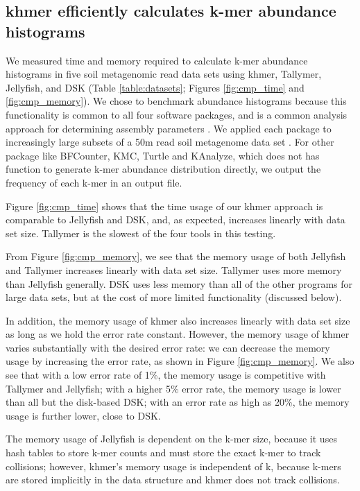 \documentclass[10pt]{article}
\begin{document}


\subsection*{khmer efficiently calculates k-mer abundance histograms}

We measured time and memory required to calculate k-mer abundance
histograms in five soil metagenomic read data sets using khmer,
Tallymer, Jellyfish, and DSK (Table \ref{table:datasets}; Figures
\ref{fig:cmp_time} and \ref{fig:cmp_memory}).  We chose to benchmark
abundance histograms because this functionality is common to all four
software packages, and is a common analysis approach for determining
assembly parameters \cite{Chikhi:2014aa}.  We applied each package to
increasingly large subsets of a 50m read soil metagenome data set
\cite{Howe2012}. For other package like BFCounter, KMC, Turtle and
KAnalyze, which does not has function to generate k-mer abundance
distribution directly, we output the frequency of each k-mer in an
output file.


Figure \ref{fig:cmp_time} shows that the time usage of our khmer
approach is comparable to Jellyfish and DSK, and, as expected,
increases linearly with data set size. Tallymer is the slowest of the
four tools in this testing.

From Figure \ref{fig:cmp_memory}, we see that the memory usage of both
Jellyfish and Tallymer increases linearly with data set size. Tallymer
uses more memory than Jellyfish generally.  DSK uses less memory than
all of the other programs for large data sets, but at the cost of more
limited functionality (discussed below).

In addition, the memory usage of khmer also increases linearly with
data set size as long as we hold the error rate constant.  However,
the memory usage of khmer varies substantially with the desired error
rate: we can decrease the memory usage by increasing the error rate,
as shown in Figure \ref{fig:cmp_memory}.  We also see that with a low
error rate of 1\%, the memory usage is competitive with Tallymer and
Jellyfish; with a higher 5\% error rate, the memory usage is lower
than all but the disk-based DSK; with an error rate as high as 20\%,
the memory usage is further lower, close to DSK.

The memory usage of Jellyfish is dependent on the k-mer size, because
it uses hash tables to store k-mer counts and must store the exact
k-mer to track collisions; however, khmer's memory usage is
independent of k, because k-mers are stored implicitly in the data
structure and khmer does not track collisions.
\end{document}
